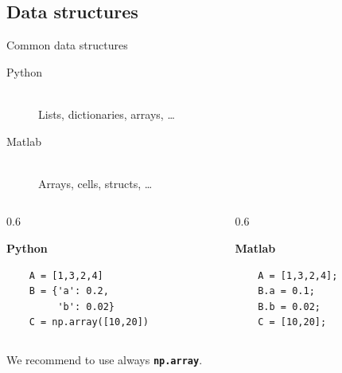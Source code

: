 \documentclass[xcolor=x11names, compress,handout]{beamer}
\renewcommand{\(}{\begin{columns}}
\renewcommand{\)}{\end{columns}}
\newcommand{\<}[1]{\begin{column}{#1}}
\renewcommand{\>}{\end{column}}
\begin{document}
\subsection{Data structures}
\begin{frame}[fragile]{Common data structures}

  \large
  \vspace{-5pt}

  \begin{description}
    \item[Python] ~ \\ \hspace{-30pt} Lists, dictionaries, arrays, \ldots
    \vspace{8pt}
    \item[Matlab] ~ \\ \hspace{-30pt} Arrays, cells, structs, \ldots
  \end{description}

  \vspace{10pt}

  \(
  \<{0.6\linewidth}

  \centering
  \textbf{Python}
  \begin{verbatim}
    A = [1,3,2,4]
    B = {'a': 0.2,
         'b': 0.02}
    C = np.array([10,20])
  \end{verbatim}

  \> \<{0.6\linewidth}

  \centering
  \textbf{Matlab}
  \begin{verbatim}
    A = [1,3,2,4];
    B.a = 0.1;
    B.b = 0.02;
    C = [10,20];
  \end{verbatim}

  \>
  \)

  \vspace{25pt}

  We recommend to use always \textbf{\texttt{np.array}}.

\end{frame}

\end{document}
